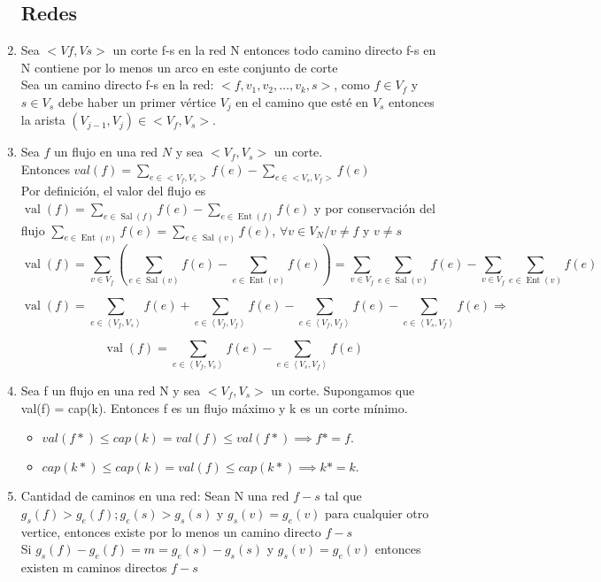 \documentclass{article}
\begin{document}
\begin{enumerate}
    \subsection{Redes}
    \item Sea $<Vf, Vs>$ un corte f-s en la red N entonces todo camino directo f-s en N contiene por lo menos un arco en este conjunto de corte \\
    Sea un camino directo f-s en la red: $<f, v_1, v_2, …, v_k, s>$, como $f \in V_f$ y $s \in V_s$ debe haber un primer vértice $V_j$ en el camino que esté en $V_s$ entonces la arista $(V_{j-1}, V_j) \in <V_f, V_s>.$
    
    \item Sea $f$ un flujo en una red $N$ y sea $<V_{f}, V_{s}>$ un corte.\\ Entonces $val(f)=\sum_{e\in<V_f,V_s>}f(e)-\sum_{e\in<V_s,V_f>}f(e)$ \\
    Por definición, el valor del flujo es $\operatorname{val}(f)=\sum_{e \in \operatorname{Sal}(f)} f(e)-\sum_{e \in \operatorname{Ent}(f)} f(e)$ y por conservación del flujo $\sum_{e \in \operatorname{Ent}(v)} f(e)=\sum_{e \in \operatorname{Sal}(v)} f(e)$, $\forall v \in V_{N} / v \neq f$ y $v \neq s$
    $$
    \operatorname{val}(f)=\sum_{v \in V_{f}}\left(\sum_{e \in \operatorname{Sal}(v)} f(e)-\sum_{e \in \operatorname{Ent}(v)} f(e)\right)=\sum_{v \in V_{f}} \sum_{e \in \operatorname{Sal}(v)} f(e)-\sum_{v \in V_{f}} \sum_{e \in \operatorname{Ent}(v)} f(e)
    $$
    
    $$
    \operatorname{val}(f)=\sum_{e \in\left\langle V_{f}, V_{s}\right\rangle} f(e)+\sum_{e \in\left\langle V_{f}, V_{f}\right\rangle} f(e)-\sum_{e \in\left\langle V_{f}, V_{f}\right\rangle} f(e)-\sum_{e \in\left\langle V_{s}, V_{f}\right\rangle} f(e) \Rightarrow
    $$
    
    $$
    \operatorname{val}(f)=\sum_{e \in\left\langle V_{f}, V_{s}\right\rangle} f(e)-\sum_{e \in\left\langle V_{s}, V_{f}\right\rangle} f(e)
    $$
    
    \item Sea f un flujo en una red N y sea $<V_f, V_s>$ un corte. Supongamos que val(f) = cap(k). Entonces f es un flujo máximo y k es un corte mínimo. \\
    \begin{itemize}
        \item $val(f*) \leq cap(k) = val(f) \leq val(f*) \implies f* = f.$
        \item $cap(k*) \leq cap(k) = val(f) \leq cap(k*) \implies k* = k.$
    \end{itemize}
    
    \item Cantidad de caminos en una red: Sean N una red $f-s$ tal que $g_s(f)>g_e(f);g_e(s)>g_s(s)$ y $g_s(v)=g_e(v)$ para cualquier otro vertice, entonces existe por lo menos un camino directo $f-s$ \\
    Si $g_s(f)-g_e(f)=m=g_e(s)-g_s(s)$ y $g_s(v)=g_e(v)$ entonces existen m caminos directos $f-s$
\end{enumerate}
\end{document}
